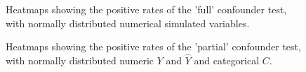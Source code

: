 \begin{figure}[H]
  \centering
  \caption{Heatmaps showing the positive rates of the 'full' confounder test, with normally distributed numerical simulated variables.}
  \label{fig:sim-ccc-full}
\end{figure}


\begin{figure}[H]
  \centering
  \caption{Heatmaps showing the positive rates of the 'partial' confounder test, with normally distributed numeric $Y$ and $\hat{Y}$ and categorical $C$.}
  \label{fig:sim-ccb-partial}
\end{figure}